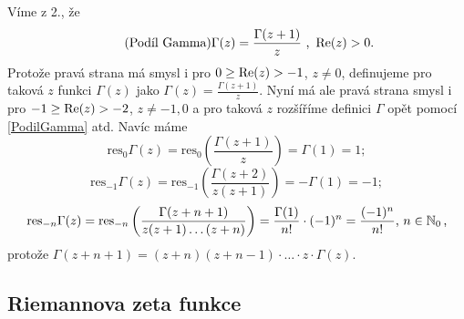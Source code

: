 \begin{enumerate}
    Víme z 2., že
    \begin{equation}\tag{Podíl Gamma}\label{PodilGamma}
        \Gamma(z)=\frac{\Gamma(z+1)}{z}\text{ , } \operatorname{Re}(z)>0 \text{.}
    \end{equation}
    Protože pravá strana má smysl i pro $0 \geq \operatorname{Re}(z)>-1$, $z \neq 0$, definujeme pro taková $z$ funkci $\Gamma (z)$ jako $\Gamma(z)=\frac{\Gamma(z+1)}{z}$.
    Nyní má ale pravá strana smysl i pro $-1 \geq \operatorname{Re}(z)>-2$, $z \neq -1, 0$ a pro taková $z$ rozšíříme definici $\Gamma$ opět pomocí \cref{PodilGamma} atd. Navíc máme
    $$
     \text{res}_{0} \Gamma (z)=\text{res}_{0}\left(\frac{\Gamma (z+1)}{z} \right)=\Gamma(1)=1;
    $$
    $$
     \text{res}_{-1} \Gamma (z)=\text{res}_{-1}\left(\frac{\Gamma (z+2)}{z(z+1)} \right)=-\Gamma(1)=-1;
    $$
     $$
     \text{res}_{-n} \Gamma (z)=\text{res}_{-n}\left(\frac{\Gamma (z+n+1)}{z(z+1)\dots (z+n)} \right)=\frac{\Gamma(1)}{n!}\cdot (-1)^n =\frac{(-1)^n}{n!}\text{, } n \in \operatorname{\mathbb{N}}_0\text{,}
    $$
    protože $\Gamma(z+n+1)=(z+n)(z+n-1) \cdot \dots \cdot z \cdot \Gamma(z)$.
\end{enumerate}

\subsection{Riemannova zeta funkce}
